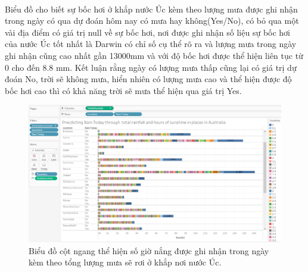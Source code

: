 \documentclass{article}
\begin{document}
\paragraph{}Biểu đồ cho biết sự bốc hơi ở khắp nước Úc kèm theo lượng mưa được ghi nhận trong ngày có qua dự đoán hôm nay có mưa hay không(Yes/No), có bỏ qua một vài địa điểm có giá trị null về sự bốc hơi, nơi được ghi nhận số liệu sự bốc hơi của nước Úc tốt nhất là Darwin có chỉ số cụ thể rõ ra và lượng mưa trong ngày ghi nhận cũng cao nhất gần 13000mm và với độ bốc hơi được thể hiện liên tục từ 0 cho đến 8.8 mm. Kết luận rằng ngày có lượng mưa thấp cũng lại có giá trị dự đoán No, trời sẽ không mưa, hiển nhiên có lượng mưa cao và thể hiện được độ bốc hơi cao thì có khả năng trời sẽ mưa thể hiện qua giá trị Yes.
\pagebreak{}
\begin{figure}[!h]
	\begin{center}
		\includegraphics[width=\linewidth]{images/tableau4.png}
		\caption{\fontsize{14}{20}\selectfont Biểu đồ cột ngang thể hiện số giờ nắng được ghi nhận trong ngày kèm theo tổng lượng mưa sẽ rơi ở khắp nơi nước Úc.}
	\end{center}
\end{figure}
\end{document}
